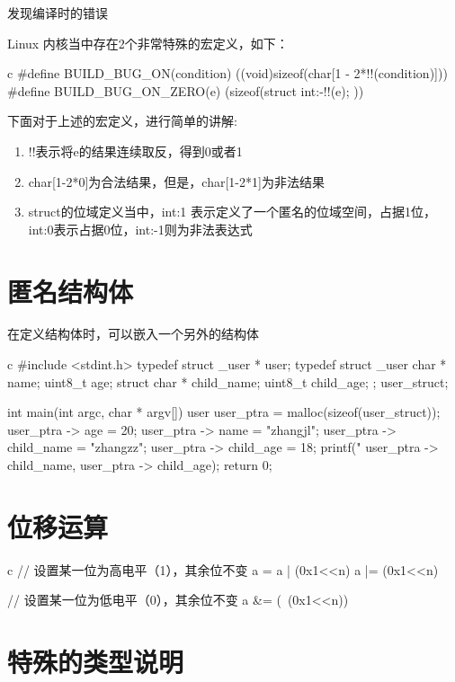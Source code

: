 \begin{outline}[enumerate]
\1 发现编译时的错误

Linux 内核当中存在2个非常特殊的宏定义，如下：
\begin{code-block}{c}
#define BUILD_BUG_ON(condition) ((void)sizeof(char[1 - 2*!!(condition)]))
#define BUILD_BUG_ON_ZERO(e) (sizeof(struct { int:-!!(e); }))
\end{code-block}

下面对于上述的宏定义，进行简单的讲解:
\begin{enumerate}
  \item !!表示将e的结果连续取反，得到0或者1
  \item char[1-2*0]为合法结果，但是，char[1-2*1]为非法结果
  \item struct的位域定义当中，int:1 表示定义了一个匿名的位域空间，占据1位，int:0表示占据0位，int:-1则为非法表达式
\end{enumerate}

\end{outline}

\section{匿名结构体}
在定义结构体时，可以嵌入一个另外的结构体
\begin{code-block}{c}
#include <stdint.h>
typedef struct _user * user;
typedef struct _user {
    char * name;
    uint8_t age;
    struct {
        char * child_name;
        uint8_t child_age;
    };
}user_struct;

int main(int argc, char * argv[])
{
    user user_ptra = malloc(sizeof(user_struct));
    user_ptra -> age = 20;
    user_ptra -> name = "zhangjl";
    user_ptra -> child_name = "zhangzz";
    user_ptra -> child_age = 18;
    printf("%
           user_ptra -> child_name, user_ptra -> child_age);
    return 0;
}
\end{code-block}

\section{位移运算}
\begin{code-block}{c}
// 设置某一位为高电平（1），其余位不变
a = a | (0x1<<n)
a |= (0x1<<n)

// 设置某一位为低电平（0），其余位不变
a &= (~(0x1<<n))
\end{code-block}

\section{特殊的类型说明}

